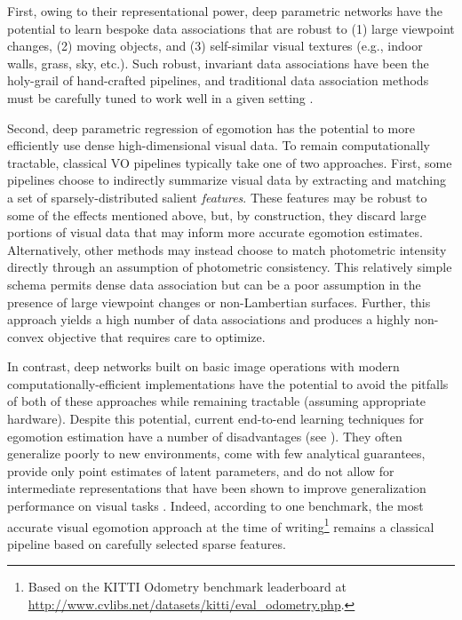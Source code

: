 First, owing to their representational power, deep parametric networks have the potential to learn bespoke data associations that are robust to (1) large viewpoint changes, (2) moving objects, and (3) self-similar visual textures (e.g., indoor walls, grass, sky, etc.). Such robust, invariant data associations have been the holy-grail of hand-crafted pipelines, and traditional data association methods must be carefully tuned to work well in a given setting \citep{schonberger_comparative_2017}.

Second, deep parametric regression of egomotion has the potential to more efficiently use dense high-dimensional visual data. To remain computationally tractable, classical VO pipelines typically take one of two approaches.  First, some pipelines \citep{Leutenegger2015-fk,Cvisic2015-mt} choose to indirectly summarize visual data by extracting and matching a set of sparsely-distributed salient \textit{features}. These features may be robust to some of the effects mentioned above, but, by construction, they discard large portions of visual data that may inform more accurate egomotion estimates. Alternatively, other methods \citep{forster2014svo, wang_stereo_2017,  engel_direct_2018} may instead choose to match photometric intensity directly through an assumption of photometric consistency. This relatively simple schema permits dense data association but can be a poor assumption in the presence of large viewpoint changes or non-Lambertian surfaces. Further, this approach yields a high number of data associations and produces a highly non-convex objective that requires care to optimize. 

In contrast, deep networks built on basic image operations with modern computationally-efficient implementations have the potential to avoid the pitfalls of both of these approaches while remaining tractable (assuming appropriate hardware). Despite this potential, current end-to-end learning techniques for egomotion estimation have a number of disadvantages (see ). They often generalize poorly to new environments, come with few analytical guarantees, provide only point estimates of latent parameters, and do not allow for intermediate representations that have been shown to improve generalization performance on visual tasks \citep{Zhou2019-se}. Indeed, according to one benchmark, the most accurate visual egomotion approach at the time of writing\footnote{Based on the KITTI Odometry benchmark leaderboard at \url{http://www.cvlibs.net/datasets/kitti/eval_odometry.php}.} remains a classical pipeline based on carefully selected sparse features.

